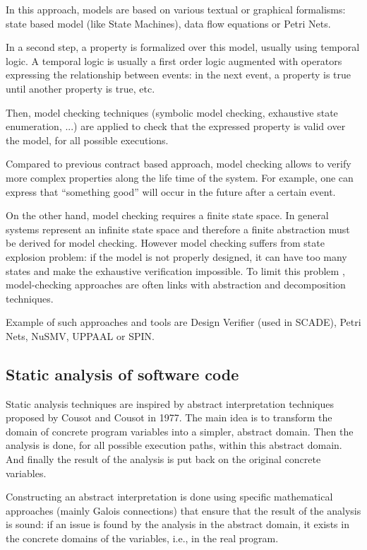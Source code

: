 In this approach, models are based on various textual or graphical
formalisms: state based model (like State Machines), data flow equations
or Petri Nets.

In a second step, a property is formalized over this model, usually
using temporal logic. A temporal logic is usually a first order logic
augmented with operators expressing the relationship between events:
in the next event, a property is true until another property is true,
etc.

Then, model checking techniques (symbolic model checking, exhaustive
state enumeration, ...) are applied to check that the expressed
property is valid over the model, for all possible executions.

Compared to previous contract based approach, model checking allows to
verify more complex properties along the life time of the system. For
example, one can express that ``something good'' will occur in the
future after a certain event.

On the other hand, model checking requires a finite state space. In
general systems represent an infinite state space and therefore a finite
abstraction must be derived for model checking. However model checking
suffers from state explosion problem: if the model is not properly
designed, it can have too many states and make the exhaustive
verification impossible. To limit this problem  , model-checking approaches are often links with abstraction and decomposition techniques.

Example of such approaches and tools are Design Verifier (used in
SCADE), Petri Nets, NuSMV, UPPAAL or SPIN.

\subsection{Static analysis of software code}

Static analysis techniques are inspired by abstract interpretation
techniques proposed by Cousot and Cousot in 1977. The main idea is to
transform the domain of concrete program variables into a simpler,
abstract domain. Then the analysis is done, for all possible execution
paths, within this abstract domain. And finally the result of the
analysis is put back on the original concrete variables.

Constructing an abstract interpretation is done using specific
mathematical approaches (mainly Galois connections) that ensure that
the result of the analysis is sound: if an issue is found by the
analysis in the abstract domain, it exists in the concrete domains of
the variables, i.e., in the real program.

